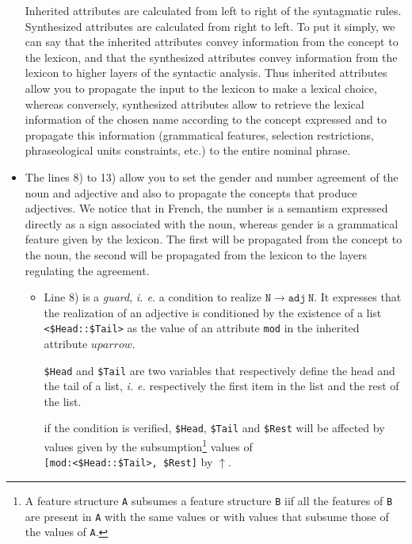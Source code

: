 \documentclass[11pt]{article}
\begin{document}
\begin{itemize}
  Inherited attributes are calculated from left to right of the
  syntagmatic rules. Synthesized attributes are calculated from right
  to left. To put it simply, we can say that the inherited attributes
  convey information from the concept to the lexicon, and that the
  synthesized attributes convey information from the lexicon to higher
  layers of the syntactic analysis. Thus inherited attributes allow you to
  propagate the input to the lexicon to make a lexical choice, whereas
  conversely, synthesized attributes allow to retrieve the lexical information of
  the chosen name according to the concept expressed and to propagate
  this information (grammatical features, selection restrictions,
  phraseological units constraints, etc.)  to the entire nominal
  phrase.
  
\item The lines 8) to 13) allow you to set the gender and
  number agreement of the noun and adjective and also to propagate the
  concepts that produce adjectives. We notice that in French, the
  number is a semantism expressed directly as a sign associated with
  the noun, whereas gender is a grammatical feature given by the
  lexicon. The first will be propagated from the concept to the noun,
  the second will be propagated from the lexicon to the layers
  regulating the agreement.
  

\begin{itemize}
  \item Line 8) is a \textit{guard}, \textit{i. e.} a
    condition to realize
    $\mathtt{N} \rightarrow \mathtt{adj}~ \mathtt{N}$. It expresses that the
    realization of an adjective is conditioned by
    the existence of a list
    \verb#<$Head::$Tail># as the value of an attribute \texttt{mod}
    in the inherited attribute $uparrow$.
    
    \verb#$Head# and
    \verb#$Tail# are two variables that respectively define the
    head and the tail of a list, \textit{i. e.} respectively the
    first item in the list and the rest of the list.
    
    if the condition is verified, 
    \verb#$Head#, \verb#$Tail# and
    \verb#$Rest# will be affected by values given by the
    subsumption\footnote{A feature structure \texttt{A} subsumes
      a feature structure \texttt{B} iif all the features of
      \texttt{B} are present in \texttt{A} with the same values
      or with values that subsume those of the
      values of \texttt{A}. } values of \\\verb#[mod:<$Head::$Tail>, $Rest]#
    by $\uparrow$.
    

\end{itemize}
\end{itemize}
\end{document}
